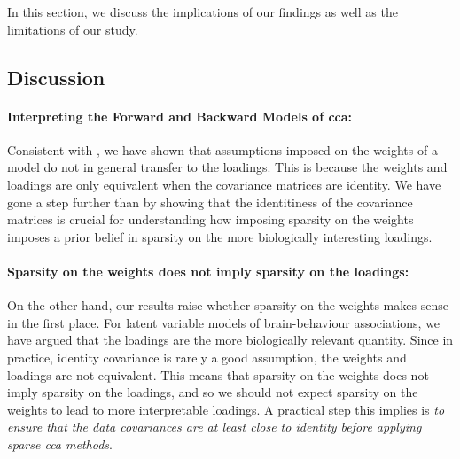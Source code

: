 In this section, we discuss the implications of our findings as well as the limitations of our study.

\subsection{Discussion}

\paragraph{Interpreting the Forward and Backward Models of \acrshort{cca}:} Consistent with \cite{haufe2014interpretation}, we have shown that assumptions imposed on the \gls{weights} of a model do not in general transfer to the loadings.
This is because the \gls{weights} and \gls{loadings} are only equivalent when the covariance matrices are identity.
We have gone a step further than \cite{haufe2014interpretation} by showing that the identitiness of the covariance matrices is crucial for understanding how imposing sparsity on the \gls{weights} imposes a prior belief in sparsity on the more biologically interesting loadings.

\paragraph{Sparsity on the \gls{weights} does not imply sparsity on the loadings:}

On the other hand, our results raise whether sparsity on the \gls{weights} makes sense in the first place.
For latent variable models of brain-behaviour associations, we have argued that the \gls{loadings} are the more biologically relevant quantity.
Since in practice, identity covariance is rarely a good assumption, the \gls{weights} and \gls{loadings} are not equivalent.
This means that sparsity on the \gls{weights} does not imply sparsity on the loadings, and so we should not expect sparsity on the \gls{weights} to lead to more interpretable loadings.
A practical step this implies is \textit{to ensure that the data covariances are at least close to identity before applying sparse \acrshort{cca} methods}.

